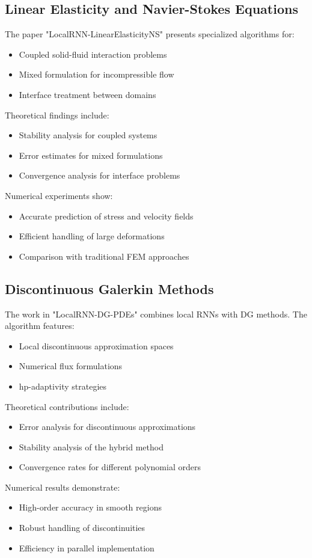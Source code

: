 \documentclass[12pt]{article}
\begin{document}
\subsection{Linear Elasticity and Navier-Stokes Equations}
\label{subsec:local_rnn_elasticity}
The paper "LocalRNN-LinearElasticityNS" presents specialized algorithms for:
\begin{itemize}
    \item Coupled solid-fluid interaction problems
    \item Mixed formulation for incompressible flow
    \item Interface treatment between domains
\end{itemize}
Theoretical findings include:
\begin{itemize}
    \item Stability analysis for coupled systems
    \item Error estimates for mixed formulations
    \item Convergence analysis for interface problems
\end{itemize}
Numerical experiments show:
\begin{itemize}
    \item Accurate prediction of stress and velocity fields
    \item Efficient handling of large deformations
    \item Comparison with traditional FEM approaches
\end{itemize}

\subsection{Discontinuous Galerkin Methods}
\label{subsec:local_rnn_dg}
The work in "LocalRNN-DG-PDEs" combines local RNNs with DG methods. The algorithm features:
\begin{itemize}
    \item Local discontinuous approximation spaces
    \item Numerical flux formulations
    \item hp-adaptivity strategies
\end{itemize}
Theoretical contributions include:
\begin{itemize}
    \item Error analysis for discontinuous approximations
    \item Stability analysis of the hybrid method
    \item Convergence rates for different polynomial orders
\end{itemize}
Numerical results demonstrate:
\begin{itemize}
    \item High-order accuracy in smooth regions
    \item Robust handling of discontinuities
    \item Efficiency in parallel implementation
\end{itemize}
\end{document}
